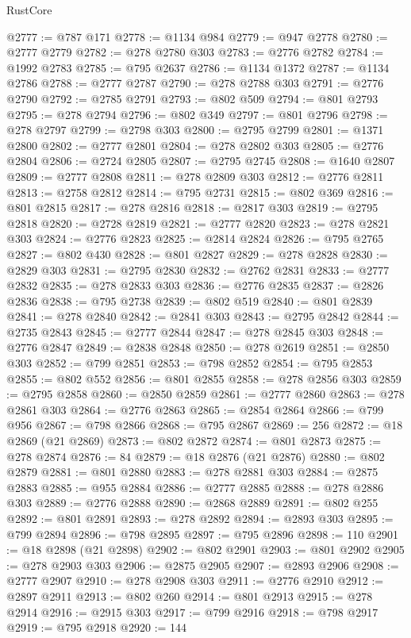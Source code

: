 \begin{lexlean}{RustCore}
\begin{coremodule}
@2777 := @787 @171
@2778 := @1134 @984
@2779 := @947 @2778
@2780 := @2777 @2779
@2782 := @278 @2780 @303
@2783 := @2776 @2782
@2784 := @1992 @2783
@2785 := @795 @2637
@2786 := @1134 @1372
@2787 := @1134 @2786
@2788 := @2777 @2787
@2790 := @278 @2788 @303
@2791 := @2776 @2790
@2792 := @2785 @2791
@2793 := @802 @509
@2794 := @801 @2793
@2795 := @278 @2794
@2796 := @802 @349
@2797 := @801 @2796
@2798 := @278 @2797
@2799 := @2798 @303
@2800 := @2795 @2799
@2801 := @1371 @2800
@2802 := @2777 @2801
@2804 := @278 @2802 @303
@2805 := @2776 @2804
@2806 := @2724 @2805
@2807 := @2795 @2745
@2808 := @1640 @2807
@2809 := @2777 @2808
@2811 := @278 @2809 @303
@2812 := @2776 @2811
@2813 := @2758 @2812
@2814 := @795 @2731
@2815 := @802 @369
@2816 := @801 @2815
@2817 := @278 @2816
@2818 := @2817 @303
@2819 := @2795 @2818
@2820 := @2728 @2819
@2821 := @2777 @2820
@2823 := @278 @2821 @303
@2824 := @2776 @2823
@2825 := @2814 @2824
@2826 := @795 @2765
@2827 := @802 @430
@2828 := @801 @2827
@2829 := @278 @2828
@2830 := @2829 @303
@2831 := @2795 @2830
@2832 := @2762 @2831
@2833 := @2777 @2832
@2835 := @278 @2833 @303
@2836 := @2776 @2835
@2837 := @2826 @2836
@2838 := @795 @2738
@2839 := @802 @519
@2840 := @801 @2839
@2841 := @278 @2840
@2842 := @2841 @303
@2843 := @2795 @2842
@2844 := @2735 @2843
@2845 := @2777 @2844
@2847 := @278 @2845 @303
@2848 := @2776 @2847
@2849 := @2838 @2848
@2850 := @278 @2619
@2851 := @2850 @303
@2852 := @799 @2851
@2853 := @798 @2852
@2854 := @795 @2853
@2855 := @802 @552
@2856 := @801 @2855
@2858 := @278 @2856 @303
@2859 := @2795 @2858
@2860 := @2850 @2859
@2861 := @2777 @2860
@2863 := @278 @2861 @303
@2864 := @2776 @2863
@2865 := @2854 @2864
@2866 := @799 @956
@2867 := @798 @2866
@2868 := @795 @2867
@2869 := 256
@2872 := @18 @2869 (@21 @2869)
@2873 := @802 @2872
@2874 := @801 @2873
@2875 := @278 @2874
@2876 := 84
@2879 := @18 @2876 (@21 @2876)
@2880 := @802 @2879
@2881 := @801 @2880
@2883 := @278 @2881 @303
@2884 := @2875 @2883
@2885 := @955 @2884
@2886 := @2777 @2885
@2888 := @278 @2886 @303
@2889 := @2776 @2888
@2890 := @2868 @2889
@2891 := @802 @255
@2892 := @801 @2891
@2893 := @278 @2892
@2894 := @2893 @303
@2895 := @799 @2894
@2896 := @798 @2895
@2897 := @795 @2896
@2898 := 110
@2901 := @18 @2898 (@21 @2898)
@2902 := @802 @2901
@2903 := @801 @2902
@2905 := @278 @2903 @303
@2906 := @2875 @2905
@2907 := @2893 @2906
@2908 := @2777 @2907
@2910 := @278 @2908 @303
@2911 := @2776 @2910
@2912 := @2897 @2911
@2913 := @802 @260
@2914 := @801 @2913
@2915 := @278 @2914
@2916 := @2915 @303
@2917 := @799 @2916
@2918 := @798 @2917
@2919 := @795 @2918
@2920 := 144

\end{coremodule}
\end{lexlean}
